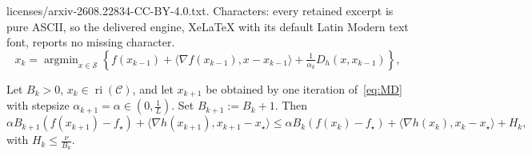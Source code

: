 \documentclass[10pt,a4paper]{amsart}
\DeclareMathOperator*{\argmin}{argmin}
\DeclareMathOperator{\ri}{ri}
\newcommand{\CC}{\mathcal{C}}
\newcommand{\coloneqq}{:=}
\newcommand{\ip}[2]{\langle #1, #2\rangle}
\renewcommand{\SS}{\mathcal{S}}
\renewcommand{\leq}{\leqslant}
\begin{document}
licenses/arxiv-2608.22834-CC-BY-4.0.txt. Characters: every retained excerpt is pure ASCII, so the delivered engine, XeLaTeX with its default Latin Modern text font, reports no missing character.
\begin{equation}\label{eq:MD}\tag{MD}
x_{k} = \argmin_{x\in \SS}\left\{ f(x_{k-1}) + \ip{\nabla f(x_{k-1})}{x - x_{k-1}} + \tfrac{1}{\alpha_k} D_{h}(x,x_{k-1})\right\},
\end{equation}

\begin{lemma}\label{lem:lyapunov_MD}
        Let $B_k> 0$, $x_k\in \ri(\CC)$, and let $x_{k+1}$ be obtained by one iteration of~\eqref{eq:MD} with stepsize $\alpha_{k+1}=\alpha\in \left(0,\tfrac1L\right)$.
        Set $B_{k+1}\coloneqq B_k+1$.
        Then
        \begin{equation}\label{eq:lyap_analysis_MD}   
            \alpha B_{k+1}(f(x_{k+1})-f_\star)+\ip{\nabla h(x_{k+1})}{ x_{k+1}-x_\star}
            \leq
            \alpha B_k (f(x_k)-f_\star)+\ip{\nabla h(x_k)}{ x_k-x_\star}+H_k,
        \end{equation}
        with $H_k\leq \tfrac{\nu}{B_k}$.
\end{lemma}
\end{document}
